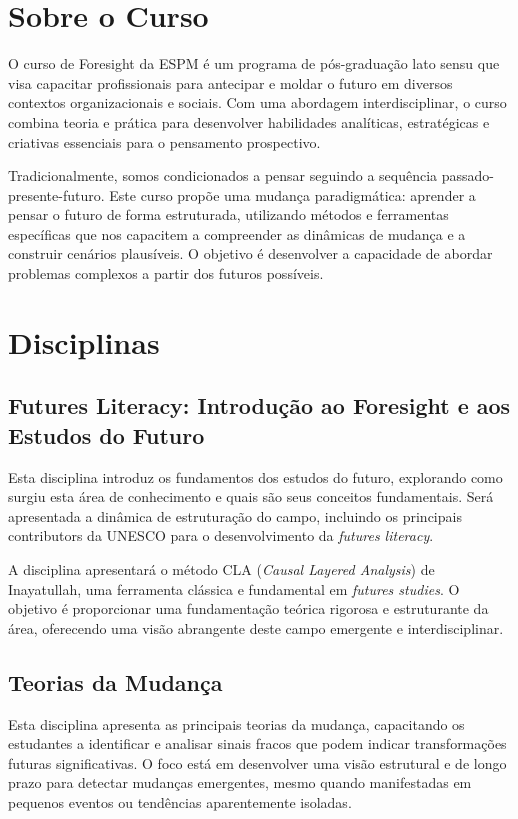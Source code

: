 \section{Sobre o Curso}

O curso de Foresight da ESPM é um programa de pós-graduação lato sensu que visa capacitar profissionais para antecipar e moldar o futuro em diversos contextos organizacionais e sociais. Com uma abordagem interdisciplinar, o curso combina teoria e prática para desenvolver habilidades analíticas, estratégicas e criativas essenciais para o pensamento prospectivo.

Tradicionalmente, somos condicionados a pensar seguindo a sequência passado-presente-futuro. Este curso propõe uma mudança paradigmática: aprender a pensar o futuro de forma estruturada, utilizando métodos e ferramentas específicas que nos capacitem a compreender as dinâmicas de mudança e a construir cenários plausíveis. O objetivo é desenvolver a capacidade de abordar problemas complexos a partir dos futuros possíveis.

\section{Disciplinas}

\subsection{Futures Literacy: Introdução ao Foresight e aos Estudos do Futuro}

Esta disciplina introduz os fundamentos dos estudos do futuro, explorando como surgiu esta área de conhecimento e quais são seus conceitos fundamentais. Será apresentada a dinâmica de estruturação do campo, incluindo os principais contributors da UNESCO para o desenvolvimento da \textit{futures literacy}.

A disciplina apresentará o método CLA (\textit{Causal Layered Analysis}) de Inayatullah, uma ferramenta clássica e fundamental em \textit{futures studies}. O objetivo é proporcionar uma fundamentação teórica rigorosa e estruturante da área, oferecendo uma visão abrangente deste campo emergente e interdisciplinar.

\subsection{Teorias da Mudança}

Esta disciplina apresenta as principais teorias da mudança, capacitando os estudantes a identificar e analisar sinais fracos que podem indicar transformações futuras significativas. O foco está em desenvolver uma visão estrutural e de longo prazo para detectar mudanças emergentes, mesmo quando manifestadas em pequenos eventos ou tendências aparentemente isoladas.

